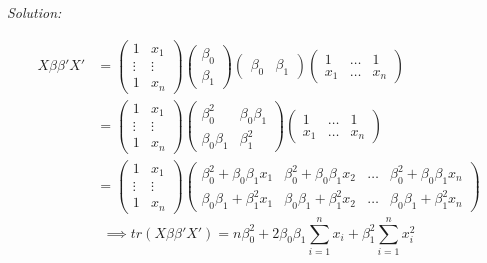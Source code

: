 \documentclass{article}
\newenvironment{solution}
    {\textit{Solution:}}
    {}
\begin{document}
\begin{solution}
\begin{itemize}
\begin{align*}
X \beta \beta' X' &= \begin{pmatrix}
1 & x_1 \\
\vdots & \vdots \\
1 & x_n
\end{pmatrix} \begin{pmatrix}
\beta_0 \\
\beta_1
\end{pmatrix}\begin{pmatrix}
\beta_0 & \beta_1
\end{pmatrix}  \begin{pmatrix}
1 & \ldots & 1 \\
x_1 & \ldots & x_n
\end{pmatrix} \\
&= \begin{pmatrix}
1 & x_1 \\
\vdots & \vdots \\
1 & x_n
\end{pmatrix} \begin{pmatrix}
\beta_0^2 & \beta_0 \beta_1 \\
\beta_0 \beta_1 & \beta_1^2
\end{pmatrix}  \begin{pmatrix}
1 & \ldots & 1 \\
x_1 & \ldots & x_n 
\end{pmatrix} \\
&= \begin{pmatrix}
1 & x_1 \\
\vdots & \vdots \\
1 & x_n
\end{pmatrix} \begin{pmatrix}
\beta_0^2 + \beta_0 \beta_1 x_1 & \beta_0^2 + \beta_0 \beta_1 x_2 & \ldots & \beta_0^2 + \beta_0 \beta_1 x_n \\
\beta_0 \beta_1 + \beta_1^2 x_1 & \beta_0 \beta_1 + \beta_1^2 x_2 & \ldots & \beta_0 \beta_1 + \beta_1^2 x_n 
\end{pmatrix} 
\end{align*} 
$$\implies tr(X \beta \beta' X') = n \beta_0^2 + 2 \beta_0 \beta_1 \sum_{i = 1}^n x_i + \beta_1^2 \sum_{i = 1}^n x_i^2$$



\end{itemize}
\end{solution}
\end{document}
